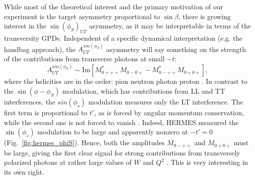 While most of the theoretical interest and the primary motivation of our
experiment is the target asymmetry proportional to $\sin\beta$, there is
growing interest in the $\sin(\phi_S)_{UT}$ asymmetry, as it may be
interpretable in terms of the transversity GPDs.  
Independent of a specific dynamical interpretation
(e.g. the handbag approach), the $A_{UT}^{sin(\phi_S)}$ asymmetry will say
something on the strength of the contributions from transverse photons at
small $-t$:
\begin{equation}
A_{UT}^{sin(\phi_S)}\sim\mathrm{Im}[M^*_{0+++}M_{0-0+} - M^*_{0-++}M_{0+0+}],
\end{equation}
where the helicities are in the order: pion neutron photon proton
\cite{Go10}.  In contrast to the $\sin(\phi-\phi_S)$ modulation, which
has contributions from LL and TT interferences, the $sin(\phi_s)$ modulation
measures only the LT interference.  The first term is proportional to $t'$, as
is forced by angular momentum conservation, while the second one is not forced
to vanish \cite{GoPC}.  Indeed, HERMES measured the $\sin(\phi_s)$ modulation
to be large and apparently nonzero at $-t'=0$ (Fig.~\ref{fig:hermes_phiS}).
Hence, both the amplitudes $M_{0-++}$ and $M_{0+0+}$ must be large, giving the
first clear signal for strong contributions from transversely polarized photons
at rather large values of $W$ and $Q^2$ \cite{Go10}.  This is very interesting
in its own right.

